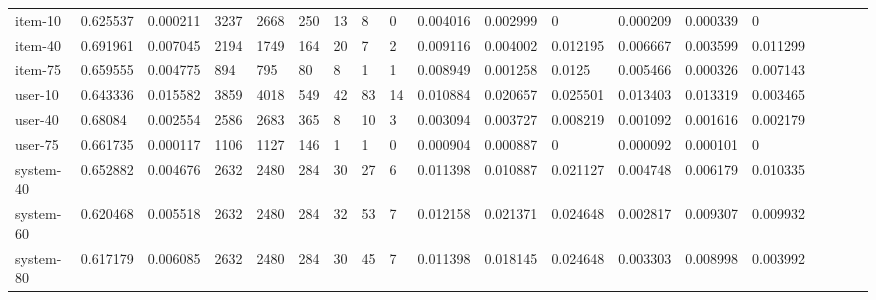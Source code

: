 \begin{table}
{\begin{tabular}{*{19}l}
item-10 &   0.625537 &  0.000211 &  3237 &  2668 &  250 &   13 &    8 & 0 & 0.004016 &  0.002999 &  0 & 0.000209 &  0.000339 &  0 &  \\
item-40 &   0.691961 &  0.007045 &  2194 &  1749 &  164 &   20 &    7 & 2 & 0.009116 &  0.004002 &  0.012195 &  0.006667 &  0.003599 &  0.011299 &   \\
item-75 &   0.659555 &  0.004775 &  894 &   795 &   80 &    8 & 1 & 1 & 0.008949 &  0.001258 &  0.0125 &    0.005466 &  0.000326 &  0.007143 &   \\
user-10 &   0.643336 &  0.015582 &  3859 &  4018 &  549 &   42 &    83 &    14 &    0.010884 &  0.020657 &  0.025501 &  0.013403 &  0.013319 &  0.003465 &   \\
user-40 &   0.68084 &   0.002554 &  2586 &  2683 &  365 &   8 & 10 &    3 & 0.003094 &  0.003727 &  0.008219 &  0.001092 &  0.001616 &  0.002179 &   \\
user-75 &   0.661735 &  0.000117 &  1106 &  1127 &  146 &   1 & 1 & 0 & 0.000904 &  0.000887 &  0 & 0.000092 &  0.000101 &  0 &  \\
system-40   &   0.652882 &  0.004676 &  2632 &  2480 &  284 &   30 &    27 &    6 & 0.011398 &  0.010887 &  0.021127 &  0.004748 &  0.006179 &  0.010335 &   \\
system-60   &   0.620468 &  0.005518 &  2632 &  2480 &  284 &   32 &    53 &    7 & 0.012158 &  0.021371 &  0.024648 &  0.002817 &  0.009307 &  0.009932 &   \\
system-80   &   0.617179 &  0.006085 &  2632 &  2480 &  284 &   30 &    45 &    7 & 0.011398 &  0.018145 &  0.024648 &  0.003303 &  0.008998 &  0.003992 &   \\




\end{tabular}}
\end{table}
